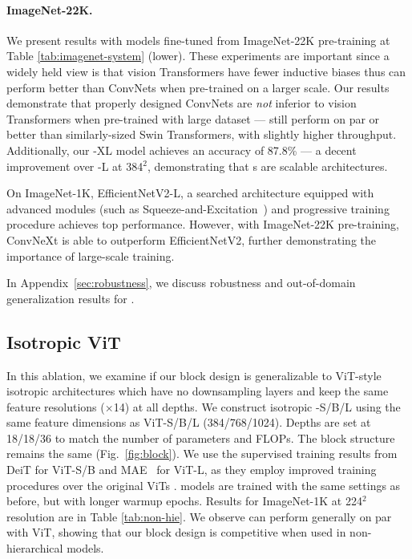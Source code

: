 \paragraph{ImageNet-22K.}
We present results with models fine-tuned from ImageNet-22K pre-training at Table \ref{tab:imagenet-system} (lower). 
These experiments are important since a widely held view is that vision Transformers have fewer inductive biases thus can perform better than ConvNets when pre-trained on a larger scale. 
 Our results demonstrate that properly designed ConvNets are \emph{not} inferior to vision Transformers when pre-trained with large dataset ---  still perform on par or better than similarly-sized Swin Transformers, with slightly higher throughput. Additionally, our \cnn{}-XL model achieves an accuracy of 87.8\% --- a decent improvement over \cnn{}-L at 384$^2$, demonstrating that \cnn{}s are scalable architectures. 
 
On ImageNet-1K, EfficientNetV2-L, a searched architecture equipped with advanced modules (such as Squeeze-and-Excitation~\cite{hu2018squeeze}) and progressive training procedure achieves top performance. However, with ImageNet-22K pre-training, ConvNeXt is able to outperform EfficientNetV2, further demonstrating the importance of large-scale training.

In Appendix~\ref{sec:robustness}, we discuss robustness and out-of-domain generalization results for \cnn{}.

\subsection{Isotropic \cnn{} \vs ViT}
\label{subsec:isotropic} 
In this ablation, we examine if our \cnn{} block design is generalizable to ViT-style~\cite{Dosovitskiy2021} isotropic architectures which have no downsampling layers and keep the same feature resolutions ($\times$14) at all depths. We construct isotropic \cnn{}-S/B/L using the same feature dimensions as ViT-S/B/L (384/768/1024). Depths are set at 18/18/36 to match the number of parameters and FLOPs. The block structure remains the same (Fig.~\ref{fig:block}).
We use the supervised training results from DeiT \cite{Touvron2020} for ViT-S/B and MAE~\cite{he2021masked} for ViT-L, as they employ improved training procedures over the original ViTs \cite{Dosovitskiy2021}. \cnn{} models are trained with the same settings as before, but with longer warmup epochs. Results for ImageNet-1K at 224$^2$ resolution are in Table \ref{tab:non-hie}. We observe \cnn{} can perform generally on par with ViT, showing that our \cnn{} block design is competitive when used in non-hierarchical models. 

